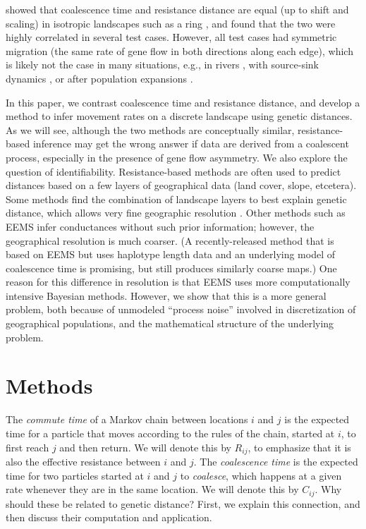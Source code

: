 \documentclass{article}
\begin{document}
\citet{mcrae2006isolation} showed that coalescence time and resistance distance are equal
(up to shift and scaling) in isotropic landscapes such as a ring \citep{matsen2006convergence},
and found that the two were highly correlated in several test cases.
However, all test cases had symmetric migration
(the same rate of gene flow in both directions along each edge),
which is likely not the case in many situations, e.g.,
in rivers \citep{morrissey2009maintenance,sundqvist2016directional,hanks2017modeling},
with source-sink dynamics \citep{dias1996sources},
or after population expansions \citep{with2002landscape}.

In this paper, we contrast 
coalescence time and resistance distance,
and develop a method to infer movement rates on a discrete landscape
using genetic distances.
As we will see,
although the two methods are conceptually similar,
resistance-based inference may get the wrong answer if data are derived from a coalescent process,
especially in the presence of gene flow asymmetry. 
We also explore the question of identifiability.
Resistance-based methods are often used to predict distances based on a few layers of geographical data
(land cover, slope, etcetera).
Some methods find the combination of landscape layers to best explain genetic distance,
which allows very fine geographic resolution \citep{shaffer2017desert}.
Other methods such as EEMS \citep{petkova2016visualizing} infer conductances without such prior information; 
however, the geographical resolution is much coarser.
(A recently-released method 
that is based on EEMS but uses haplotype length data and an underlying model of coalescence time
\citep{alasadi2018estimating}
is promising, but still produces similarly coarse maps.)
One reason for this difference in resolution
is that EEMS uses more computationally intensive Bayesian methods.
However, we show that this is a more general problem, 
both because of unmodeled ``process noise'' involved in discretization of geographical populations,
and the mathematical structure of the underlying problem.


\section*{Methods}


The \emph{commute time} of a Markov chain between locations $i$ and $j$
is the expected time for a particle that moves according to the rules of the chain, 
started at $i$, to first reach $j$ and then return.
We will denote this by $R_{ij}$, to emphasize that it is also the effective resistance
between $i$ and $j$.
The \emph{coalescence time} is the expected time for two particles started at $i$ and $j$
to \emph{coalesce},
which happens at a given rate whenever they are in the same location.
We will denote this by $C_{ij}$.
Why should these be related to genetic distance? 
First, we explain this connection,
and then discuss their computation and application.
\end{document}
